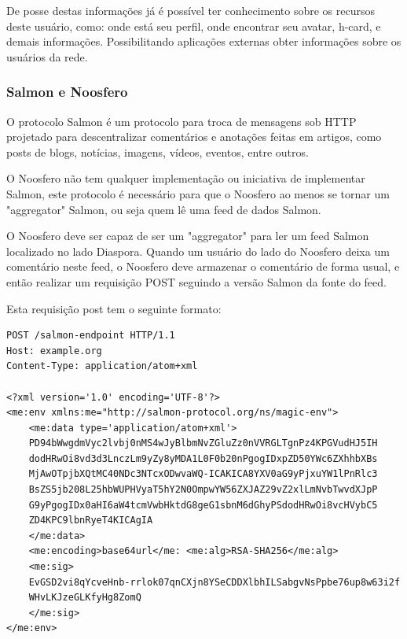 \documentclass[12pt]{article}
\begin{document}
De posse destas informações já é possível ter conhecimento sobre os recursos
deste usuário, como: onde está seu perfil, onde encontrar seu avatar, h-card,
e demais informações. Possibilitando aplicações externas obter informações
sobre os usuários da rede.

\subsubsection{Salmon e Noosfero}

O protocolo Salmon é um protocolo para troca de mensagens sob HTTP projetado
para descentralizar comentários e anotações feitas em artigos, como posts de
blogs, notícias, imagens, vídeos, eventos, entre outros.

O Noosfero não tem qualquer implementação ou iniciativa de implementar Salmon,
este protocolo é necessário para que o Noosfero ao menos se tornar um
"aggregator" Salmon, ou seja quem lê uma feed de dados Salmon.

O Noosfero deve ser capaz de ser um "aggregator" para ler um feed Salmon
localizado no lado Diaspora. Quando um usuário do lado do Noosfero deixa um
comentário neste feed, o Noosfero deve armazenar o comentário de forma usual,
e então realizar um requisição POST\cite{salmon} seguindo a versão Salmon da
fonte do feed.

Esta requisição post tem o seguinte formato:

\begin{framed}
\begin{lstlisting}[caption=Exemplo requisição POST Salmon]
POST /salmon-endpoint HTTP/1.1
Host: example.org
Content-Type: application/atom+xml

<?xml version='1.0' encoding='UTF-8'?>
<me:env xmlns:me="http://salmon-protocol.org/ns/magic-env">
    <me:data type='application/atom+xml'>
    PD94bWwgdmVyc2lvbj0nMS4wJyBlbmNvZGluZz0nVVRGLTgnPz4KPGVudHJ5IH
    dodHRwOi8vd3d3LnczLm9yZy8yMDA1L0F0b20nPgogIDxpZD50YWc6ZXhhbXBs
    MjAwOTpjbXQtMC40NDc3NTcxODwvaWQ-ICAKICA8YXV0aG9yPjxuYW1lPnRlc3
    BsZS5jb208L25hbWUPHVyaT5hY2N0OmpwYW56ZXJAZ29vZ2xlLmNvbTwvdXJpP
    G9yPgogIDx0aHI6aW4tcmVwbHktdG8geG1sbnM6dGhyPSdodHRwOi8vcHVybC5
    ZD4KPC9lbnRyeT4KICAgIA
    </me:data>
    <me:encoding>base64url</me: <me:alg>RSA-SHA256</me:alg>
    <me:sig>
    EvGSD2vi8qYcveHnb-rrlok07qnCXjn8YSeCDDXlbhILSabgvNsPpbe76up8w63i2f
    WHvLKJzeGLKfyHg8ZomQ
    </me:sig>
</me:env>
\end{lstlisting}
\end{framed}
\end{document}
